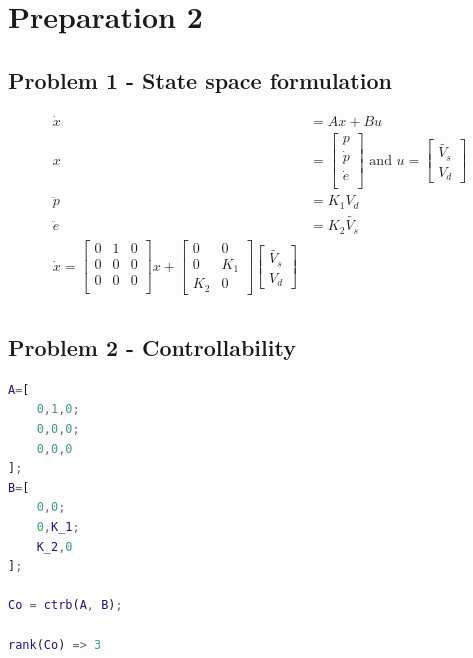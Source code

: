 \section{Preparation 2}


\subsection{Problem 1 - State space formulation}
\begin{align*}
    \dot{x}&=Ax+Bu \\
    x&=
    \begin{bmatrix}
        p \\
        \dot{p} \\
        \dot{e} \\
    \end{bmatrix}
    \text{ and } u=
    \begin{bmatrix}
        \tilde{V_s} \\
        V_d
    \end{bmatrix}\\
    \ddot{p}&=K_1 V_d \\
    \ddot{e}&=K_2 \tilde{V_s}\\
    \dot{x}=
    \begin{bmatrix}
        0&1&0 \\
        0&0&0 \\
        0&0&0 \\
    \end{bmatrix}
    x+
    \begin{bmatrix}
        0&0 \\
        0&K_1 \\
        K_2&0
    \end{bmatrix}
    \begin{bmatrix}
        \tilde{V_s} \\
        V_d
    \end{bmatrix}\\
\end{align*}

\subsection{Problem 2 - Controllability}

\begin{lstlisting}[language=Matlab]
A=[
    0,1,0;
    0,0,0;
    0,0,0
];
B=[
    0,0;
    0,K_1;
    K_2,0
];

Co = ctrb(A, B);

rank(Co) => 3
\end{lstlisting}

